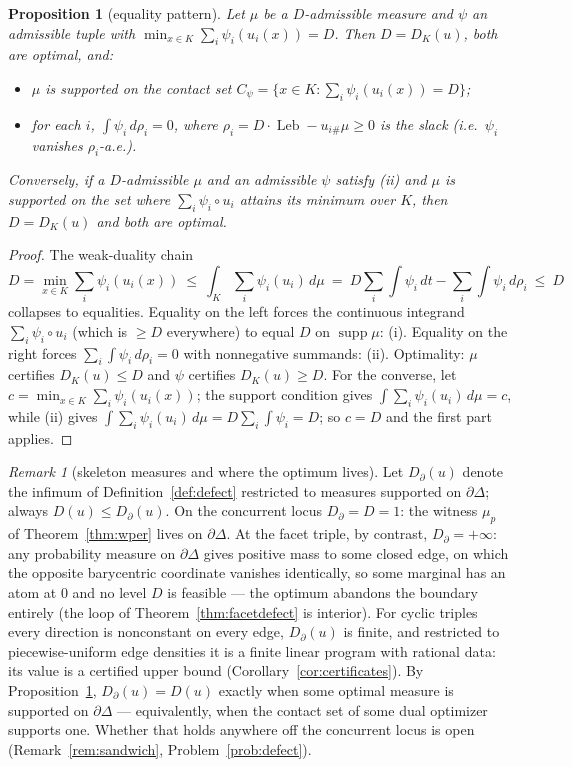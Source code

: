 \documentclass{aims}
\numberwithin{equation}{section}
\theoremstyle{plain}
\newtheorem{proposition}[theorem]{Proposition}
\theoremstyle{definition}
\theoremstyle{remark}
\newtheorem{remark}[theorem]{Remark}
\newcommand{\Leb}{\operatorname{Leb}}
\begin{document}
\begin{proposition}[equality pattern]\label{prop:slack}
Let $\mu$ be a $D$-admissible measure and $\psi$ an admissible tuple with
$\min_{x\in K}\sum_i\psi_i(u_i(x))=D$. Then $D=D_K(u)$, both are optimal,
and:
\begin{itemize}
\item[(i)] $\mu$ is supported on the \emph{contact set}
$C_\psi=\bigl\{x\in K:\sum_i\psi_i(u_i(x))=D\bigr\}$;
\item[(ii)] for each $i$, $\int\psi_i\,d\rho_i=0$, where
$\rho_i=D\cdot\Leb-u_{i\#}\mu\ge0$ is the slack (i.e.\ $\psi_i$ vanishes
$\rho_i$-a.e.).
\end{itemize}
Conversely, if a $D$-admissible $\mu$ and an admissible
$\psi$ satisfy (ii) and $\mu$ is supported on the set where
$\sum_i\psi_i\circ u_i$ attains its minimum over $K$, then
$D=D_K(u)$ and both are optimal.
\end{proposition}

\begin{proof}
The weak-duality chain
\[
D=\min_{x\in K}\sum_i\psi_i(u_i(x))\ \le\ \int_K\sum_i\psi_i(u_i)\,d\mu
\ =\ D\sum_i\int\psi_i\,dt-\sum_i\int\psi_i\,d\rho_i\ \le\ D
\]
collapses to equalities. Equality on the left forces the continuous integrand
$\sum_i\psi_i\circ u_i$ (which is $\ge D$ everywhere) to equal $D$ on
$\operatorname{supp}\mu$: (i). Equality on the right forces
$\sum_i\int\psi_i\,d\rho_i=0$ with nonnegative summands: (ii). Optimality:
$\mu$ certifies $D_K(u)\le D$ and $\psi$ certifies $D_K(u)\ge D$. For the
converse, let $c=\min_{x\in K}\sum_i\psi_i(u_i(x))$; the support condition
gives $\int\sum_i\psi_i(u_i)\,d\mu=c$, while (ii) gives
$\int\sum_i\psi_i(u_i)\,d\mu=D\sum_i\int\psi_i=D$; so $c=D$ and the first
part applies.
\end{proof}

\begin{remark}[skeleton measures and where the optimum lives]
\label{rem:skeleton}
Let $D_\partial(u)$ denote the infimum of Definition~\ref{def:defect}
restricted to measures supported on $\partial\Delta$; always
$D(u)\le D_\partial(u)$. On the concurrent locus
$D_\partial=D=1$: the witness $\mu_p$ of Theorem~\ref{thm:wper} lives on
$\partial\Delta$. At the facet triple, by contrast, $D_\partial=+\infty$:
any probability measure on $\partial\Delta$ gives positive mass to some
closed edge, on which the opposite barycentric coordinate vanishes
identically, so some marginal has an atom at $0$ and no level $D$ is
feasible --- the optimum abandons the boundary entirely (the loop of
Theorem~\ref{thm:facetdefect} is interior). For cyclic triples every
direction is nonconstant on every edge, $D_\partial(u)$ is finite, and
restricted to piecewise-uniform edge densities it is a finite linear program
with rational data: its value is a certified upper bound
(Corollary~\ref{cor:certificates}). By Proposition~\ref{prop:slack},
$D_\partial(u)=D(u)$ exactly when some optimal measure is supported on
$\partial\Delta$ --- equivalently, when the contact set of some dual
optimizer supports one. Whether that holds anywhere off the concurrent locus
is open (Remark~\ref{rem:sandwich}, Problem~\ref{prob:defect}).
\end{remark}
\end{document}
